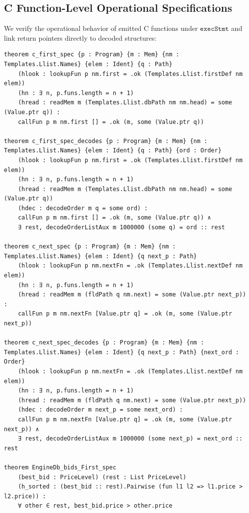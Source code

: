 \documentclass[11pt,a4paper]{article}
\begin{document}
\subsection{C Function-Level Operational Specifications}

We verify the operational behavior of emitted C functions under $\mathtt{execStmt}$ and link return pointers directly to decoded structures:

\begin{lstlisting}[language=lean4]
theorem c_first_spec {p : Program} {m : Mem} {nm : Templates.Llist.Names} {elem : Ident} {q : Path}
    (hlook : lookupFun p nm.first = .ok (Templates.Llist.firstDef nm elem))
    (hn : ∃ n, p.funs.length = n + 1)
    (hread : readMem m (Templates.Llist.dbPath nm nm.head) = some (Value.ptr q)) :
    callFun p m nm.first [] = .ok (m, some (Value.ptr q))

theorem c_first_spec_decodes {p : Program} {m : Mem} {nm : Templates.Llist.Names} {elem : Ident} {q : Path} {ord : Order}
    (hlook : lookupFun p nm.first = .ok (Templates.Llist.firstDef nm elem))
    (hn : ∃ n, p.funs.length = n + 1)
    (hread : readMem m (Templates.Llist.dbPath nm nm.head) = some (Value.ptr q))
    (hdec : decodeOrder m q = some ord) :
    callFun p m nm.first [] = .ok (m, some (Value.ptr q)) ∧
    ∃ rest, decodeOrderListAux m 1000000 (some q) = ord :: rest

theorem c_next_spec {p : Program} {m : Mem} {nm : Templates.Llist.Names} {elem : Ident} {q next_p : Path}
    (hlook : lookupFun p nm.nextFn = .ok (Templates.Llist.nextDef nm elem))
    (hn : ∃ n, p.funs.length = n + 1)
    (hread : readMem m (fldPath q nm.next) = some (Value.ptr next_p)) :
    callFun p m nm.nextFn [Value.ptr q] = .ok (m, some (Value.ptr next_p))

theorem c_next_spec_decodes {p : Program} {m : Mem} {nm : Templates.Llist.Names} {elem : Ident} {q next_p : Path} {next_ord : Order}
    (hlook : lookupFun p nm.nextFn = .ok (Templates.Llist.nextDef nm elem))
    (hn : ∃ n, p.funs.length = n + 1)
    (hread : readMem m (fldPath q nm.next) = some (Value.ptr next_p))
    (hdec : decodeOrder m next_p = some next_ord) :
    callFun p m nm.nextFn [Value.ptr q] = .ok (m, some (Value.ptr next_p)) ∧
    ∃ rest, decodeOrderListAux m 1000000 (some next_p) = next_ord :: rest

theorem EngineDb_bids_First_spec
    (best_bid : PriceLevel) (rest : List PriceLevel)
    (h_sorted : (best_bid :: rest).Pairwise (fun l1 l2 => l1.price > l2.price)) :
    ∀ other ∈ rest, best_bid.price > other.price
\end{lstlisting}
\end{document}
